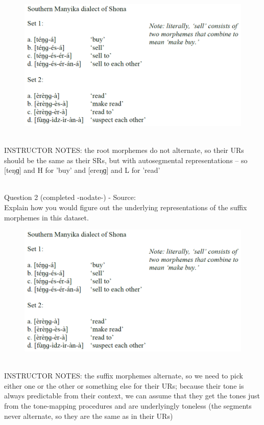 \documentclass[12pt]{article}
\begin{document}
\begin{figure}[H]
\includegraphics{../images/shona.png}
\end{figure}

~\\
INSTRUCTOR NOTES: the root morphemes do not alternate, so their URs should be the same as their SRs, but with autosegmental representations -- so [teŋɡ] and H for 'buy' and [ereŋɡ] and L for 'read' 


~\\

{\large Question 2} (completed -nodate-) - Source: \\

Explain how you would figure out the underlying representations of the suffix morphemes in this dataset.\\

\begin{figure}[H]
\includegraphics{../images/shona.png}
\end{figure}

~\\
INSTRUCTOR NOTES: the suffix morphemes alternate, so we need to pick either one or the other or something else for their URs; because their tone is always predictable from their context, we can assume that they get the tones just from the tone-mapping procedures and are underlyingly toneless (the segments never alternate, so they are the same as in their URs)
\end{document}
